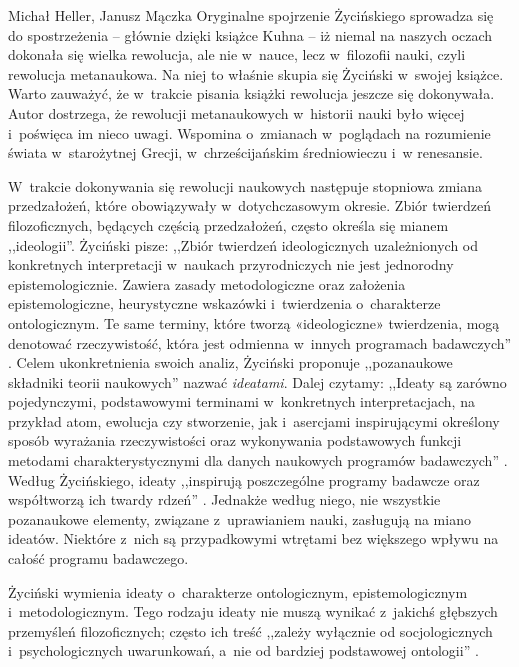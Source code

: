 \begin{newrevplenv2auth}{Michał Heller, Janusz Mączka}
Oryginalne spojrzenie Życińskiego sprowadza się do spostrzeżenia -- głównie dzięki książce Kuhna -- iż niemal na naszych oczach dokonała się wielka rewolucja, ale nie w~nauce, lecz w~filozofii nauki, czyli rewolucja metanaukowa. Na niej to właśnie skupia się Życiński w~swojej książce. Warto zauważyć, że w~trakcie pisania książki rewolucja jeszcze się dokonywała. Autor dostrzega, że rewolucji metanaukowych w~historii nauki było więcej i~poświęca im nieco uwagi. Wspomina o~zmianach w~poglądach na rozumienie świata w~starożytnej Grecji, w~chrześcijańskim średniowieczu i~w renesansie.

W~trakcie dokonywania się rewolucji naukowych następuje stopniowa zmiana przedzałożeń, które obowiązywały w~dotychczasowym okresie. Zbiór twierdzeń filozoficznych, będących częścią przedzałożeń, często określa się mianem ,,ideologii''. Życiński pisze: ,,Zbiór twierdzeń ideologicznych uzależnionych od konkretnych interpretacji w~naukach przyrodniczych nie jest jednorodny epistemologicznie. Zawiera zasady metodologiczne oraz założenia epistemologiczne, heurystyczne wskazówki i~twierdzenia o~charakterze ontologicznym. Te same terminy, które tworzą «ideologiczne» twierdzenia, mogą denotować rzeczywistość, która jest odmienna w~innych programach badawczych''
\parencite[][s.~33]{zycinski_struktura_2013}. %
 Celem ukonkretnienia swoich analiz, Życiński proponuje ,,pozanaukowe składniki teorii naukowych'' nazwać \textit{ideatami}. Dalej czytamy: ,,Ideaty są zarówno pojedynczymi, podstawowymi terminami w~konkretnych interpretacjach, na przykład atom, ewolucja czy stworzenie, jak i~asercjami inspirującymi określony sposób wyrażania rzeczywistości oraz wykonywania podstawowych funkcji metodami charakterystycznymi dla danych naukowych programów badawczych'' 
\parencite[][s.~34]{zycinski_struktura_2013}. %
 Według Życińskiego, ideaty ,,inspirują poszczególne programy badawcze oraz współtworzą ich twardy rdzeń'' 
\parencite[][s.~34]{zycinski_struktura_2013}. %
 Jednakże według niego, nie wszystkie pozanaukowe elementy, związane z~uprawianiem nauki, zasługują na miano ideatów. Niektóre z~nich są przypadkowymi wtrętami bez większego wpływu na całość programu badawczego.

Życiński wymienia ideaty o~charakterze ontologicznym, epistemologicznym i~metodologicznym. Tego rodzaju ideaty nie muszą wynikać z~jakichś głębszych przemyśleń filozoficznych; często ich treść ,,zależy wyłącznie od socjologicznych i~psychologicznych uwarunkowań, a~nie od bardziej podstawowej ontologii''
\parencite[][s.~51]{zycinski_struktura_2013}.%



\end{newrevplenv2auth}

